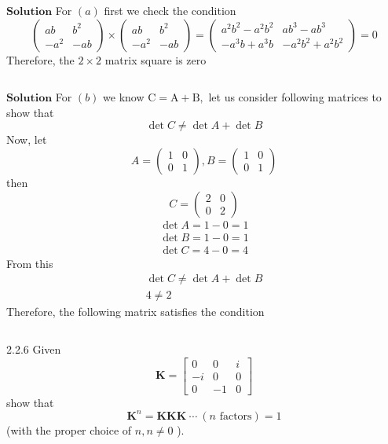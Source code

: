 $\boxed{\textbf{Solution}}$ For $(a)$ first we check the condition
$$
\left(\begin{array}{cc}
a b & b^{2} \\
-a^{2} & -a b
\end{array}\right) \times\left(\begin{array}{cc}
a b & b^{2} \\
-a^{2} & -a b
\end{array}\right)=\left(\begin{array}{cc}
a^{2} b^{2}-a^{2} b^{2} & a b^{3}-a b^{3} \\
-a^{3} b+a^{3} b & -a^{2} b^{2}+a^{2} b^{2}
\end{array}\right)=0
$$
Therefore, the $2\times 2$ matrix square is zero

$$$$

$\boxed{\textbf{Solution}}$ For $(b)$ we know $\mathrm{C}=\mathrm{A}+\mathrm{B},$ let us consider following matrices to show that
$$
\operatorname{det} C \neq \operatorname{det} A+\operatorname{det} B
$$
Now, let
$$
A=\left(\begin{array}{ll}
1 & 0 \\
0 & 1
\end{array}\right), B=\left(\begin{array}{ll}
1 & 0 \\
0 & 1
\end{array}\right)
$$
then 
$$
C=\left(\begin{array}{ll}
2 & 0 \\
0 & 2
\end{array}\right)
$$
$$
\begin{array}{l}
\operatorname{det} A=1-0=1 \\
\operatorname{det} B=1-0=1 \\
\operatorname{det} C=4-0=4
\end{array}
$$
From this
$$
\begin{array}{l}
\operatorname{det} C \neq \operatorname{det} A+\operatorname{det} B \\
4 \neq 2
\end{array}
$$
Therefore, the following matrix satisfies the condition

$$$$

\begin{mybox}{2.2.6}
Given
$$
\mathbf{K}=\begin{bmatrix}{0} & {0} & {i} \\ {-i} & {0} & {0} \\ {0} & {-1} & {0}\end{bmatrix}
$$
show that
$$
\mathbf{K}^{n}=\mathbf{KKK} \ \cdots \ (n \text { factors})=1
$$
(with the proper choice of $n, n \neq 0$ ).
\end{mybox}




